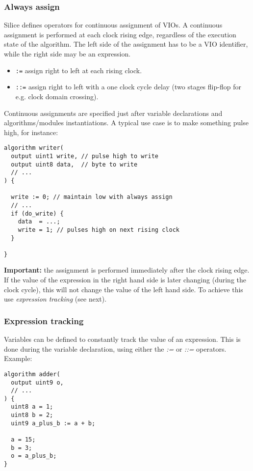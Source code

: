 \documentclass[a4]{article}
\newcommand\silice{Silice}
\begin{document}
\subsubsection{Always assign}
\label{sec:contassign}

\silice{} defines operators for continuous assignment of VIOs.
A continuous assignment is performed at each clock rising edge, regardless of the execution state of the algorithm. The left side of the assignment has to be a VIO identifier, while the right side may be an expression.
\begin{itemize}
\item \texttt{:=} assign right to left at each rising clock.
\item \texttt{::=} assign right to left with a one clock cycle delay (two stages flip-flop for e.g. clock domain crossing).
\end{itemize}

Continuous assignments are specified just after variable declarations and algorithms/modules instantiations. A typical use case is to make something pulse high, for instance:

\begin{verbatim}
algorithm writer(
  output uint1 write, // pulse high to write
  output uint8 data,  // byte to write
  // ...
) {

  write := 0; // maintain low with always assign
  // ...
  if (do_write) {
    data  = ...;
    write = 1; // pulses high on next rising clock
  }
  
}
\end{verbatim}


\textbf{Important:} the assignment is performed immediately after the clock rising edge. If the value of the expression in the right hand side is later changing (during the clock cycle), this will not change the value of the left hand side.
To achieve this use \textit{expression tracking} (see next).

\subsubsection{Expression tracking}
\label{sec:exprtrack}

Variables can be defined to constantly track the value of an expression. This is done during the variable declaration, using either the \textit{:=} or \textit{::=} operators. Example:

\begin{verbatim}
algorithm adder(
  output uint9 o,
  // ...
) {
  uint8 a = 1;
  uint8 b = 2;
  uint9 a_plus_b := a + b;
  
  a = 15;
  b = 3;
  o = a_plus_b;
}
\end{verbatim}
\end{document}

